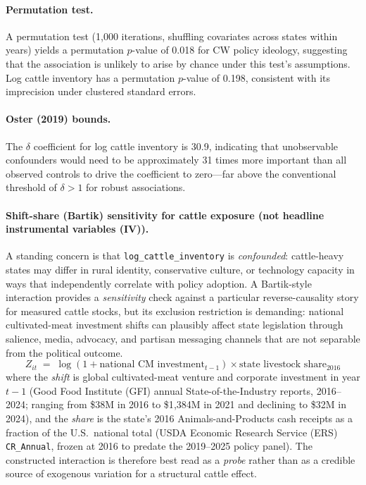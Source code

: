 \documentclass[12pt]{article}
\begin{document}
\paragraph{Permutation test.}  A permutation test (1,000 iterations, shuffling covariates across states within years) yields a permutation $p$-value of 0.018 for CW policy ideology, suggesting that the association is unlikely to arise by chance under this test's assumptions.  Log cattle inventory has a permutation $p$-value of 0.198, consistent with its imprecision under clustered standard errors.

\paragraph{Oster (2019) bounds.}  The \citet{oster2019unobservable} $\delta$ coefficient for log cattle inventory is 30.9, indicating that unobservable confounders would need to be approximately 31 times more important than all observed controls to drive the coefficient to zero---far above the conventional threshold of $\delta > 1$ for robust associations.

\paragraph{Shift-share (Bartik) sensitivity for cattle exposure (not headline instrumental variables (IV)).}
A standing concern is that \texttt{log\_cattle\_inventory} is \emph{confounded}: cattle-heavy states may differ in rural identity, conservative culture, or technology capacity in ways that independently correlate with policy adoption.  A Bartik-style interaction provides a \emph{sensitivity} check against a particular reverse-causality story for measured cattle stocks, but its exclusion restriction is demanding: national cultivated-meat investment shifts can plausibly affect state legislation through salience, media, advocacy, and partisan messaging channels that are not separable from the political outcome.
\begin{equation}
    Z_{it} \;=\; \log\!\left(1 + \text{national CM investment}_{t-1}\right)
              \times \text{state livestock share}_{2016}
    \label{eq:bartik}
\end{equation}
where the \emph{shift} is global cultivated-meat venture and corporate investment in year $t-1$ (Good Food Institute (GFI) annual State-of-the-Industry reports, 2016--2024; ranging from \$38M in 2016 to \$1{,}384M in 2021 and declining to \$32M in 2024), and the \emph{share} is the state's 2016 Animals-and-Products cash receipts as a fraction of the U.S.\ national total (USDA Economic Research Service (ERS) \texttt{CR\_Annual}, frozen at 2016 to predate the 2019--2025 policy panel).  The constructed interaction is therefore best read as a \emph{probe} rather than as a credible source of exogenous variation for a structural cattle effect.
\end{document}
